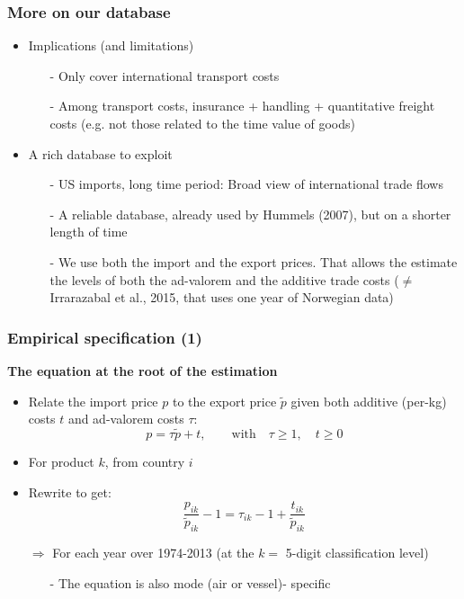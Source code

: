 \documentclass[10 pt,Helvetica, french]{beamer}
\begin{document}
\begin{frame}
\frametitle{More on our database}
\begin{itemize}
\item Implications (and limitations) \vspace{0.1cm}
\begin{itemize}
\item[-] Only cover international transport costs \vspace{0.1cm}
\item[-] Among transport costs, insurance + handling + quantitative freight costs (e.g. not those related to the time value of goods) \vspace{0.1cm}
\end{itemize}
\item A rich database to exploit \vspace{0.1cm}
\begin{itemize}
\item[-] US imports, long time period: Broad view of international trade flows \vspace{0.1cm}
\item[-] A reliable database, already used by Hummels (2007), but on a shorter length of time \vspace{0.1cm}
\item[-] We use both the import and the export prices. That allows the estimate the levels of both the ad-valorem and the additive trade costs ($\neq$ Irrarazabal et al., 2015, that uses one year of Norwegian data)
\end{itemize}
\end{itemize}
\end{frame}

\begin{frame}
\frametitle{Empirical specification (1)}
\textbf{The equation at the root of the estimation}
\begin{itemize}
\item Relate the import price $p$ to the export price $\widetilde{p}$ given both additive (per-kg) costs $t$ and ad-valorem costs $\tau$:
$$p = \tau \widetilde{p} + t, \qquad \text{with}\quad \tau \geq 1,\quad t \geq 0$$
\item For product $k$, from country $i$  \vspace{0.1cm}
\item Rewrite to get:
$$\frac{p_{ik}}{\widetilde{p}_{ik}} -1 = \tau_{ik} -1 +\frac{t_{ik}}{ \widetilde{p}_{ik}}$$
\item[$\Rightarrow$] For each year over 1974-2013 (at the $k=$ 5-digit classification level) \vspace{0.1cm}
\begin{itemize}
\item[-] The equation is also mode (air or vessel)- specific
\end{itemize}
\end{itemize}
\end{frame}
\end{document}
